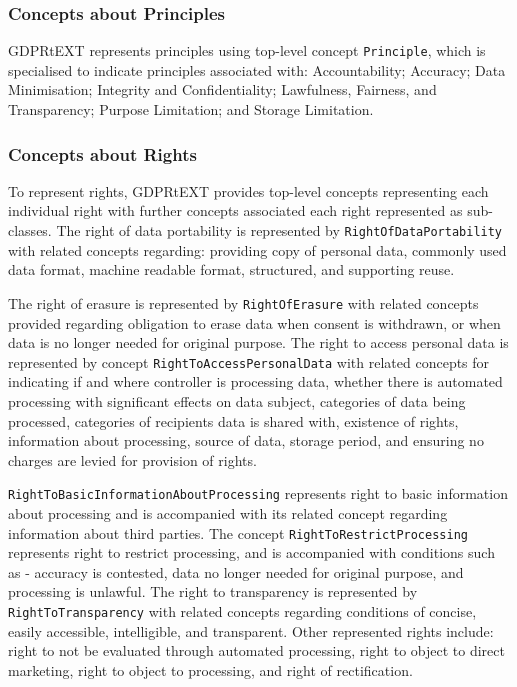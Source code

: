 \subsubsection{Concepts about Principles}
GDPRtEXT represents principles using top-level concept \texttt{Principle}, which is specialised to indicate principles associated with: Accountability; Accuracy; Data Minimisation; Integrity and Confidentiality; Lawfulness, Fairness, and Transparency; Purpose Limitation; and Storage Limitation.

\subsubsection{Concepts about Rights}
To represent rights, GDPRtEXT provides top-level concepts representing each individual right with further concepts associated each right represented as sub-classes. 
The right of data portability is represented by \texttt{RightOfDataPortability} with related concepts regarding: providing copy of personal data, commonly used data format, machine readable format, structured, and supporting reuse.

The right of erasure is represented by \texttt{RightOfErasure} with related concepts provided regarding obligation to erase data when consent is withdrawn, or when data is no longer needed for original purpose. The right to access personal data is represented by concept \texttt{RightToAccessPersonalData} with related concepts for indicating if and where controller is processing data, whether there is automated processing with significant effects on data subject, categories of data being processed, categories of recipients data is shared with, existence of rights, information about processing, source of data, storage period, and ensuring no charges are levied for provision of rights.

\texttt{RightToBasicInformationAboutProcessing} represents right to basic information about processing and is accompanied with its related concept regarding information about third parties. The concept \texttt{RightToRestrictProcessing} represents right to restrict processing, and is accompanied with conditions such as - accuracy is contested, data no longer needed for original purpose, and processing is unlawful. The right to transparency is represented by \texttt{RightToTransparency} with related concepts regarding conditions of concise, easily accessible, intelligible, and transparent. Other represented rights include: right to not be evaluated through automated processing, right to object to direct marketing, right to object to processing, and right of rectification.

